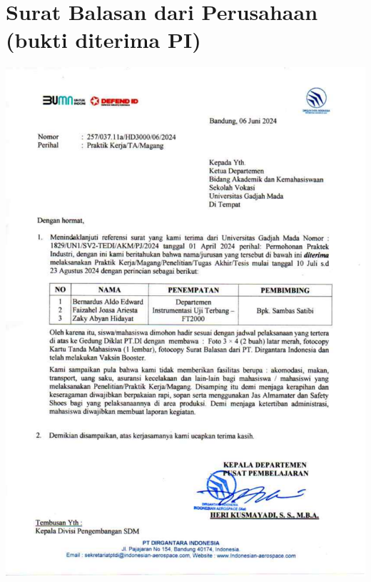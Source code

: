\newpage
\section{Surat Balasan dari Perusahaan (bukti diterima PI)}
\includegraphics[scale=0.7]{dokumen/magang-ptdi.pdf}

\newpage
